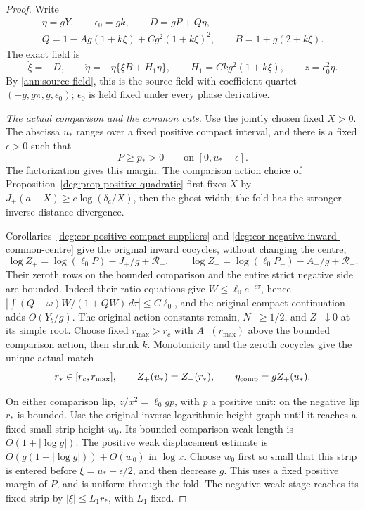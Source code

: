 \begin{proof}
Write
\[
 \begin{gathered}
 \eta=gY,\qquad \epsilon_0=gk,\qquad D=gP+Q\eta,\\
 Q=1-Ag(1+k\xi)+Cg^2(1+k\xi)^2,
 \qquad B=1+g(2+k\xi).
 \end{gathered}
\]
The exact field is
\[
 \dot\xi=-D,\qquad
 \dot\eta=-\eta\{\xi B+H_1\eta\},
 \qquad H_1=Ckg^2(1+k\xi),
 \qquad z=\epsilon_0^2\eta.
\]
By \eqref{ann:source-field}, this is the source field with coefficient quartet
\((-g,g\pi,g,\epsilon_0)\); \(\epsilon_0\) is held fixed under
every phase derivative.

\smallskip
\noindent\emph{The actual comparison and the common cuts.}
Use the jointly chosen fixed \(X>0\). The abscissa \(u_*\) ranges over a
fixed positive compact interval, and there is a fixed \(\epsilon>0\)
such that
\[
 P\ge p_*>0\qquad\text{on }[0,u_*+\epsilon].
\]
The factorization gives this margin. The comparison action choice
of Proposition~\ref{deg:prop-positive-quadratic} first fixes \(X\)
by \(J_+(a-X)\ge c\log(\delta_c/X)\), then the ghost width;
the fold has the stronger inverse-distance divergence.

Corollaries~\ref{deg:cor-positive-compact-suppliers} and
\ref{deg:cor-negative-inward-common-centre} give the original inward
cocycles, without changing the centre,
\[
 \log Z_+=\log(\ell_0P)-J_+/g+\mathcal R_+,
 \qquad
 \log Z_-=\log(\ell_0P_-)-A_-/g+\mathcal R_-.
\]
Their zeroth rows on the bounded comparison and the entire strict
negative side are bounded. Indeed their ratio equations give
\(W\le\ell_0e^{-c\tau}\), hence
\(\left|\int (Q-\omega)W/(1+QW)\,d\tau\right|\le C\ell_0\),
and the original compact continuation adds \(O(Y_b/g)\).
The original action constants remain, \(N_-\ge1/2\), and
\(Z_-\downarrow0\) at its simple root. Choose fixed \(r_{\max}>r_c\)
with \(A_-(r_{\max})\) above the bounded comparison action, then shrink
\(k\). Monotonicity and the zeroth cocycles give the unique actual match
\[
 r_*\in[r_c,r_{\max}],\qquad Z_+(u_*)=Z_-(r_*),
 \qquad \eta_{\rm comp}=gZ_+(u_*).
\]

On either comparison lip, \(z/x^2=\ell_0gp\), with \(p\) a
positive unit: on the negative lip \(r_*\) is bounded. Use the
original inverse logarithmic-height graph until it reaches a fixed
small strip height \(w_0\). Its bounded-comparison weak length is
\(O(1+|\log g|)\). The positive weak displacement estimate is
\(O(g(1+|\log g|))+O(w_0)\) in \(\log x\).
Choose \(w_0\) first so small that this strip is entered before
\(\xi=u_*+\epsilon/2\), and then decrease \(g\).
This uses a fixed positive margin of \(P\), and is uniform through
the fold. The negative weak stage reaches its fixed strip by
\(|\xi|\le L_1r_*\), with \(L_1\) fixed.


\end{proof}
